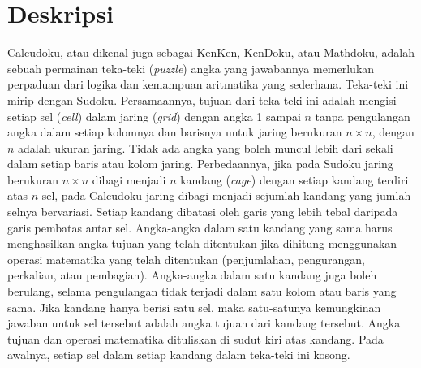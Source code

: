 \documentclass[a4paper,twoside]{article}
\begin{document}
\title{\@judultopik}
\author{\nama \textendash \@npm} 

\newcommand{\nama}{Michael Adrian}
\newcommand{\@npm}{2013730039}
\newcommand{\@judultopik}{Perbandingan Algoritma Backtracking dengan Algoritma Hybrid Genetic untuk Menyelesaikan Permainan Calcudoku} %
\newcommand{\jumpemb}{1} %
\newcommand{\tanggal}{12/09/2017}


\maketitle


\section{Deskripsi}

Calcudoku, atau dikenal juga sebagai KenKen, KenDoku, atau Mathdoku, adalah sebuah permainan teka-teki (\textit{puzzle}) angka yang jawabannya memerlukan perpaduan dari logika dan kemampuan aritmatika yang sederhana. Teka-teki ini mirip dengan Sudoku. Persamaannya, tujuan dari teka-teki ini adalah mengisi setiap sel (\textit{cell}) dalam jaring (\textit{grid}) dengan angka 1 sampai \begin{math}n\end{math} tanpa pengulangan angka dalam setiap kolomnya dan barisnya untuk jaring berukuran \begin{math}n \times n\end{math}, dengan \begin{math}n\end{math} adalah ukuran jaring. Tidak ada angka yang boleh muncul lebih dari sekali dalam setiap baris atau kolom jaring. Perbedaannya, jika pada Sudoku jaring berukuran \begin{math}n \times n\end{math} dibagi menjadi \begin{math}n\end{math} kandang (\textit{cage}) dengan setiap kandang terdiri atas \begin{math}n\end{math} sel, pada Calcudoku jaring dibagi menjadi sejumlah kandang yang jumlah selnya bervariasi. Setiap kandang dibatasi oleh garis yang lebih tebal daripada garis pembatas antar sel. Angka-angka dalam satu kandang yang sama harus menghasilkan angka tujuan yang telah ditentukan jika dihitung menggunakan operasi matematika yang telah ditentukan (penjumlahan, pengurangan, perkalian, atau pembagian). Angka-angka dalam satu kandang juga boleh berulang, selama pengulangan tidak terjadi dalam satu kolom atau baris yang sama. Jika kandang hanya berisi satu sel, maka satu-satunya kemungkinan jawaban untuk sel tersebut adalah angka tujuan dari kandang tersebut. Angka tujuan dan operasi matematika dituliskan di sudut kiri atas kandang. Pada awalnya, setiap sel dalam setiap kandang dalam teka-teki ini kosong. \cite{Fahda, JohannaLukasSaputra}
\end{document}
